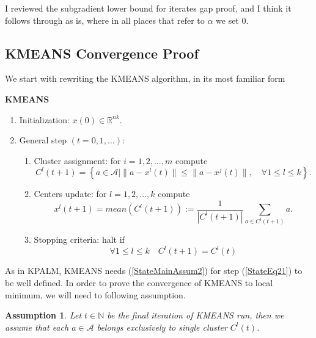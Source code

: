 \documentclass[11pt]{article}
\numberwithin{equation}{section}
\newtheorem{assumption}{Assumption}
\begin{document}
I reviewed the subgradient lower bound for iterates gap proof, and I think it follows through as is, where in all places that refer to $\alpha$ we set $0$.

\newpage


\subsection{KMEANS Convergence Proof}

We start with rewriting the KMEANS algorithm, in its most familiar form
\begin{framed}
\noindent \textbf{KMEANS}
\begin{enumerate}[(1)]
	\item Initialization: $x(0) \in \mathbb{R}^{nk}$.
	\item General step $\left( t=0,1, \ldots \right)$:
	\begin{enumerate}[(2.1)]
		\item Cluster assignment: for $i=1, 2, \ldots ,m$ compute
		\begin{equation}
			C^l(t+1) = \left\lbrace a \in \mathcal{A} \mid \| a - x^l(t) \| \leq \|a - x^j(t) \|, \quad \forall 1 \leq l \leq k \right\rbrace . \label{StateEq20}
		\end{equation}
		\item Centers update: for $l=1, 2, \ldots ,k$ compute
		\begin{equation}
			x^l(t+1) = mean(C^l(t+1)) := \frac{1}{\left| C^l(t+1) \right|} \sum\limits_{a \in C^l(t+1)} a . \label{StateEq21}
		\end{equation}
		\item Stopping criteria: halt if 
		\begin{equation}
			\forall 1 \leq l \leq k \quad C^l(t+1)=C^l(t) \label{StateEq22}
		\end{equation}
	\end{enumerate}
\end{enumerate}
\end{framed}

As in KPALM, KMEANS needs (\ref{StateMainAssum2}) for step (\ref{StateEq21}) to be well defined. In order to prove the convergence of KMEANS to local minimum, we will need to following assumption.

\begin{assumption} \label{StateEq23}
Let $t \in \mathbb{N}$ be the final iteration of KMEANS run, then we assume that each $a \in \mathcal{A}$ belongs exclusively to single cluster $C^l(t)$.
\end{assumption}
\end{document}

